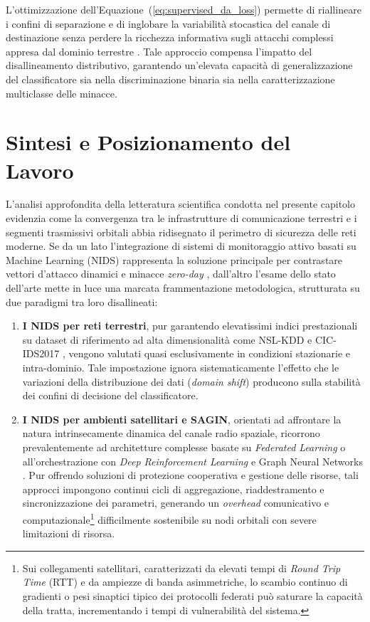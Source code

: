 L'ottimizzazione dell'Equazione~(\ref{eq:supervised_da_loss}) permette di riallineare i confini di separazione e di inglobare la variabilità stocastica del canale di destinazione senza perdere la ricchezza informativa sugli attacchi complessi appresa dal dominio terrestre \cite{motiian2017}. 
Tale approccio compensa l'impatto del disallineamento distributivo, garantendo un'elevata capacità di generalizzazione del classificatore sia nella discriminazione binaria sia nella caratterizzazione multiclasse delle minacce.

\section{Sintesi e Posizionamento del Lavoro}
\label{sec:sintesi_posizionamento}

L'analisi approfondita della letteratura scientifica condotta nel presente capitolo evidenzia come la convergenza tra le infrastrutture di comunicazione terrestri e i segmenti trasmissivi orbitali abbia ridisegnato il perimetro di sicurezza delle reti moderne. 
Se da un lato l'integrazione di sistemi di monitoraggio attivo basati su Machine Learning (NIDS) rappresenta la soluzione principale per contrastare vettori d'attacco dinamici e minacce \textit{zero-day} \cite{khraisat2019, hindy2020}, dall'altro l'esame dello stato dell'arte mette in luce una marcata frammentazione metodologica, strutturata su due paradigmi tra loro disallineati:

\begin{enumerate}
    \item \textbf{I NIDS per reti terrestri}, pur garantendo elevatissimi indici prestazionali su dataset di riferimento ad alta dimensionalità come NSL-KDD \cite{tavallaee2009} e CIC-IDS2017 \cite{sharafaldin2018}, vengono valutati quasi esclusivamente in condizioni stazionarie e intra-dominio. Tale impostazione ignora sistematicamente l'effetto che le variazioni della distribuzione dei dati (\textit{domain shift}) producono sulla stabilità dei confini di decisione del classificatore.
    \item \textbf{I NIDS per ambienti satellitari e SAGIN}, orientati ad affrontare la natura intrinsecamente dinamica del canale radio spaziale, ricorrono prevalentemente ad architetture complesse basate su \textit{Federated Learning} \cite{wan2025} o all'orchestrazione con \textit{Deep Reinforcement Learning} e Graph Neural Networks \cite{alam2024}. Pur offrendo soluzioni di protezione cooperativa e gestione delle risorse, tali approcci impongono continui cicli di aggregazione, riaddestramento e sincronizzazione dei parametri, generando un \textit{overhead} comunicativo e computazionale\footnote{Sui collegamenti satellitari, caratterizzati da elevati tempi di \textit{Round Trip Time} (RTT) e da ampiezze di banda asimmetriche, lo scambio continuo di gradienti o pesi sinaptici tipico dei protocolli federati può saturare la capacità della tratta, incrementando i tempi di vulnerabilità del sistema.} difficilmente sostenibile su nodi orbitali con severe limitazioni di risorsa.
\end{enumerate}

